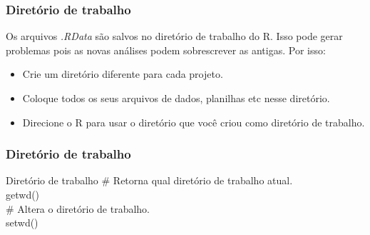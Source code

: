 \documentclass{beamer}
\begin{document}
\begin{frame}
  \frametitle{Diretório de trabalho}
  
    Os arquivos \textit{.RData} são salvos no diretório de trabalho do R. Isso pode gerar problemas pois as novas análises podem sobrescrever as antigas. Por isso:
    \begin{itemize}
      \item <1-3>Crie um diretório diferente para cada projeto.
      \item <2-3> Coloque todos os seus arquivos de dados, planilhas etc nesse diretório.
     \item<3> Direcione o R para usar o diretório que você criou como diretório de trabalho.
    \end{itemize}
\end{frame}
\begin{frame}
  \frametitle{Diretório de trabalho}
  \begin{block}{Diretório de trabalho}
    \# Retorna qual diretório de trabalho atual.\\
     getwd() \\
    \# Altera o diretório de trabalho.\\
     setwd()
  \end{block}
\end{frame}
\end{document}
